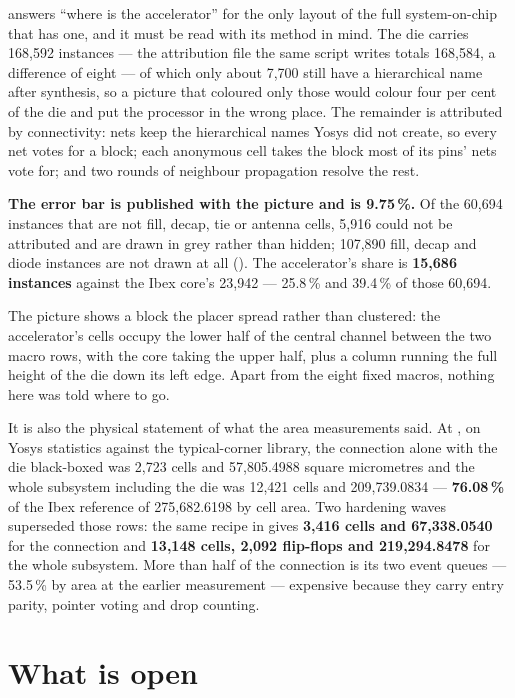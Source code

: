  answers ``where is the accelerator'' for the only
layout of the full system-on-chip that has one, and it must be read
with its method in mind. The die carries 168,592 instances --- the
attribution file the same script writes totals 168,584, a difference of
eight --- of which only about 7,700 still have a hierarchical name
after synthesis, so a picture that coloured only those would colour
four per cent of the die and put the processor in the wrong place. The
remainder is attributed by connectivity: nets keep the hierarchical
names Yosys did not create, so every net votes for a block; each
anonymous cell takes the block most of its pins' nets vote for; and two
rounds of neighbour propagation resolve the rest.

\textbf{The error bar is published with the picture and is 9.75\,\%.}
Of the 60,694 instances that are not fill, decap, tie or antenna cells,
5,916 could not be attributed and are drawn in grey rather than hidden;
107,890 fill, decap and diode instances are not drawn at all
(). The
accelerator's share is \textbf{15,686 instances} against the Ibex
core's 23,942 --- 25.8\,\% and 39.4\,\% of those 60,694.

The picture shows a block the placer spread rather than clustered: the
accelerator's cells occupy the lower half of the central channel
between the two macro rows, with the core taking the upper half, plus a
column running the full height of the die down its left edge. Apart
from the eight fixed macros, nothing here was told where to go.

It is also the physical statement of what the area measurements said.
At , on Yosys statistics against the
typical-corner library, the connection alone with the die black-boxed
was 2,723 cells and 57,805.4988 square micrometres and the whole
subsystem including the die was 12,421 cells and 209,739.0834 ---
\textbf{76.08\,\%} of the Ibex reference of 275,682.6198 by cell area.
Two hardening waves superseded those rows: the same recipe in
 gives \textbf{3,416 cells and 67,338.0540} for
the connection and \textbf{13,148 cells, 2,092 flip-flops and
219,294.8478} for the whole subsystem. More than half of the connection
is its two event queues --- 53.5\,\% by area at the earlier measurement
--- expensive because they carry entry parity, pointer voting and drop
counting.

\section{What is open}


